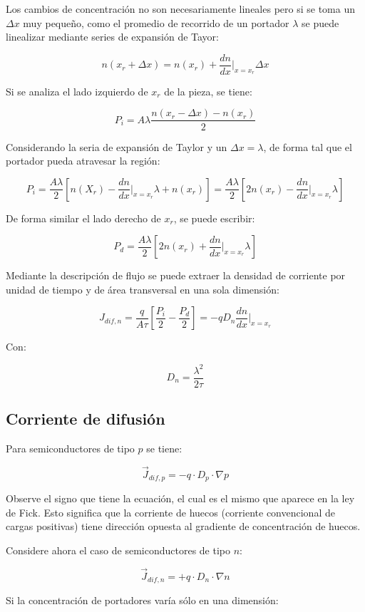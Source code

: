 Los cambios de concentración no son necesariamente lineales pero si se toma un $\Delta x$ muy pequeño, como el promedio de recorrido de un portador $\lambda$ se puede linealizar mediante series de expansión de Tayor:

\[ n(x_{r}+\Delta x) = n(x_{r}) + \dfrac{dn}{dx}|_{x=x_{r}} \Delta x \]

Si se analiza el lado izquierdo de $x_{r}$ de la pieza, se tiene:

\[ P_{i} = A\lambda \dfrac{n(x_{r}-\Delta x) - n(x_{r})} {2} \]

Considerando la seria de expansión de Taylor y un $\Delta x= \lambda$, de forma tal que el portador pueda atravesar la región:

\[ P_{i} = \dfrac{A\lambda}{2} \left[ n(X_{r}) - \dfrac{dn}{dx} |_{x=x_{r}} \lambda + n(x_{r}) \right] = \dfrac{A\lambda}{2} \left[ 2 n(x_{r}) - \dfrac{dn}{dx} |_{x=x_{r}} \lambda \right]\]

De forma similar el lado derecho de $x_{r}$, se puede escribir:

\[ P_{d} = \dfrac{A\lambda}{2} \left[ 2 n(x_{r}) + \dfrac{dn}{dx} |_{x=x_{r}} \lambda \right]\]

Mediante la descripción de flujo se puede extraer la densidad de corriente por unidad de tiempo y de área transversal en una sola dimensión:

\[ J_{dif,n} = \dfrac{q}{A \tau} \left[ \dfrac{P_{i}}{2} - \dfrac{P_{d}}{2} \right] = -q D_{n} \dfrac{dn}{dx} |_{x=x_{r}} \]

Con: 

\[ D_{n} = \dfrac{\lambda^{2}}{2 \tau}  \]

\subsection{Corriente de difusión}

Para semiconductores de tipo $p$ se tiene:

\[ \vec{J}_{dif,p} = -q \cdot D_p \cdot \nabla p \]

Observe el signo que tiene la ecuación, el cual es el mismo que aparece en la ley de Fick. Esto significa que la corriente de huecos (corriente convencional de cargas positivas) tiene dirección opuesta al gradiente de concentración de huecos. 

Considere ahora el caso de semiconductores de tipo $n$:

\[ \vec{J}_{dif,n} = +q \cdot D_n \cdot \nabla n \]

Si la concentración de portadores varía sólo en una dimensión:

